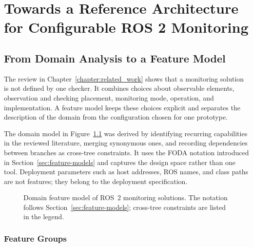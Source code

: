 \chapter{Towards a Reference Architecture for Configurable ROS 2 Monitoring}
\label{chapter:design}

\section{From Domain Analysis to a Feature Model}

The review in Chapter~\ref{chapter:related_work} shows that a monitoring
solution is not defined by one checker. It combines choices about observable
elements, observation and checking placement, monitoring mode, operation, and
implementation. A feature model keeps these choices explicit and separates the
description of the domain from the configuration chosen for one prototype.

The domain model in Figure~\ref{fig:feature-model-domain} was derived by
identifying recurring capabilities in the reviewed literature, merging
synonymous ones, and recording dependencies between branches as cross-tree
constraints. It uses the FODA notation introduced in
Section~\ref{sec:feature-models} and captures the design space rather than one
tool. Deployment parameters such as host addresses, ROS names, and class paths
are not features; they belong to the deployment specification.

\begin{figure}
  \centering
  \resizebox{!}{16.8cm}{}
  \caption{Domain feature model of ROS~2 monitoring solutions. The notation
  follows Section~\ref{sec:feature-models}; cross-tree constraints are listed
  in the legend.}
  \label{fig:feature-model-domain}
\end{figure}

\subsection{Feature Groups}

